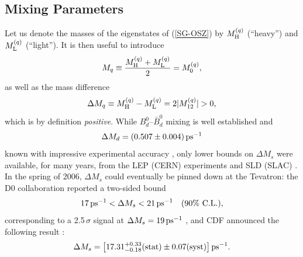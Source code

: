 \documentclass[12pt]{article}
\begin{document}
\subsection{Mixing Parameters}\label{ssec:Mix-Par}
%
%
%
Let us denote the masses of the eigenstates of (\ref{SG-OSZ}) by 
$M^{(q)}_{\rm H}$ (``heavy'') and $M^{(q)}_{\rm L}$ (``light''). 
It is then useful to introduce 
\begin{equation}
M_q\equiv\frac{M^{(q)}_{\rm H}+M^{(q)}_{\rm L}}{2}=
M^{(q)}_0,
\end{equation}
as well as the mass difference
\begin{equation}\label{DeltaMq-def}
\Delta M_q\equiv M_{\rm H}^{(q)}-M_{\rm L}^{(q)}=2|M_{12}^{(q)}|>0,
\end{equation}
which is by definition {\it positive}. While $B^0_d$--$\bar B^0_d$ mixing is well established and
\begin{equation}\label{DMd-exp}
\Delta M_d = (0.507\pm 0.004)\,{\rm ps}^{-1}
\end{equation}
known with impressive
experimental accuracy \cite{HFAG},  only lower bounds on $\Delta M_s$ 
were available,  for many years, from the LEP (CERN) 
experiments and SLD (SLAC) \cite{LEPBOSC}. In the spring of 2006, 
$\Delta M_s$ could eventually be pinned down at the Tevatron: the D0 
collaboration reported a two-sided bound 
\begin{equation}\label{D0-range}
17 \,{\rm ps}^{-1}< \Delta M_s < 21\,{\rm ps}^{-1} \quad \mbox{(90\% C.L.)},
\end{equation}
corresponding to a 2.5\,$\sigma$ signal at $\Delta M_s=19\,{\rm ps}^{-1}$ 
\cite{D0}, and CDF announced the following result \cite{CDF}:
\begin{equation}\label{CDF-DMs}
\Delta M_s = \left[17.31^{+0.33}_{-0.18}({\rm
  stat})\pm 0.07({\rm syst})\right]{\rm ps}^{-1}.
\end{equation}
\end{document}
